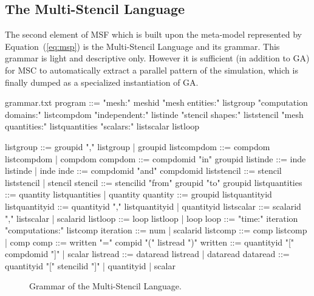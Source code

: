 \subsection{The Multi-Stencil Language}

The second element of MSF which is built upon the meta-model represented by Equation~(\ref{eq:msp}) is the Multi-Stencil Language and its grammar. This grammar is light and descriptive only. However it is sufficient (in addition to GA) for MSC to automatically extract a parallel pattern of the simulation, which is finally dumped as a specialized instantiation of GA.

\begin{filecontents*}{grammar.txt}
program ::= "mesh:" meshid 
            "mesh entities:" listgroup
            "computation domains:" listcompdom
            "independent:" listinde
            "stencil shapes:" liststencil
            "mesh quantities:" listquantities
            "scalars:" listscalar
            listloop

listgroup ::= groupid "," listgroup | groupid
listcompdom ::= compdom listcompdom | compdom
compdom ::= compdomid "in" groupid
listinde ::= inde listinde | inde
inde ::= compdomid "and" compdomid
liststencil ::= stencil liststencil | stencil
stencil ::= stencilid "from" groupid "to" groupid
listquantities ::= quantity listquantities |  quantity
quantity ::= groupid listquantityid
listquantityid ::= quantityid "," listquantityid |  quantityid
listscalar ::= scalarid "," listscalar | scalarid
listloop ::= loop listloop | loop
loop ::=  "time:" iteration
          "computations:" listcomp
iteration ::= num | scalarid
listcomp ::= comp listcomp |  comp
comp ::= written "=" compid "(" listread ")"
written ::= quantityid "[" compdomid "]" | scalar
listread ::= dataread listread | dataread
dataread ::= quantityid "[" stencilid "]" |  quantityid | scalar
\end{filecontents*}

\begin{figure}[hbt]
  \hspace{5mm}
  \begin{minipage}[!h]{0.98\textwidth}
    {}   
    \caption{Grammar of the Multi-Stencil Language. \label{fig:grammar}}
  \end{minipage}
\end{figure}

